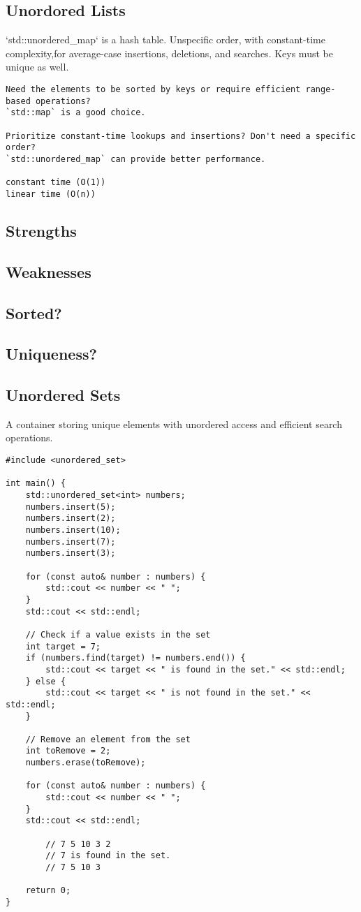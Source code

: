 \subsection{Unordored Lists}

`std::unordered\_map` is a hash table. 
Unspecific order, with constant-time complexity,for average-case 
insertions, deletions, and searches. 
Keys must be unique as well.

\begin{verbatim}
Need the elements to be sorted by keys or require efficient range-based operations?
`std::map` is a good choice.

Prioritize constant-time lookups and insertions? Don't need a specific order? 
`std::unordered_map` can provide better performance.

constant time (O(1)) 
linear time (O(n))
\end{verbatim}

\subsection{Strengths}
\subsection{Weaknesses}
\subsection{Sorted?}
\subsection{Uniqueness?}

\subsection{Unordered Sets}

A container storing unique elements with unordered access and efficient search operations.

\begin{verbatim}
#include <unordered_set>

int main() {
    std::unordered_set<int> numbers;
    numbers.insert(5);
    numbers.insert(2);
    numbers.insert(10);
    numbers.insert(7);
    numbers.insert(3);

    for (const auto& number : numbers) {
        std::cout << number << " ";
    }
    std::cout << std::endl;

    // Check if a value exists in the set
    int target = 7;
    if (numbers.find(target) != numbers.end()) {
        std::cout << target << " is found in the set." << std::endl;
    } else {
        std::cout << target << " is not found in the set." << std::endl;
    }

    // Remove an element from the set
    int toRemove = 2;
    numbers.erase(toRemove);

    for (const auto& number : numbers) {
        std::cout << number << " ";
    }
    std::cout << std::endl;

        // 7 5 10 3 2
        // 7 is found in the set.
        // 7 5 10 3

    return 0;
}
\end{verbatim}
